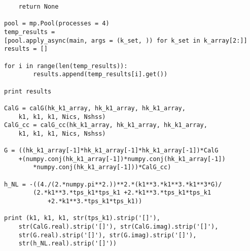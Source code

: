 \documentclass[12pt,a4paper,oneside]{book}
\begin{document}
\begin{appendices}
\begin{small}
\begin{verbatim}
    return None

pool = mp.Pool(processes = 4)
temp_results = 
[pool.apply_async(main, args = (k_set, )) for k_set in k_array[2:]]
results = []

for i in range(len(temp_results)):
        results.append(temp_results[i].get())

print results

CalG = calG(hk_k1_array, hk_k1_array, hk_k1_array, 
	k1, k1, k1, Nics, Nshss)
CalG_cc = calG_cc(hk_k1_array, hk_k1_array, hk_k1_array, 
	k1, k1, k1, Nics, Nshss)

G = ((hk_k1_array[-1]*hk_k1_array[-1]*hk_k1_array[-1])*CalG 
	+(numpy.conj(hk_k1_array[-1])*numpy.conj(hk_k1_array[-1])
		*numpy.conj(hk_k1_array[-1]))*CalG_cc)

h_NL = -((4./(2.*numpy.pi**2.))**2.*(k1**3.*k1**3.*k1**3*G)/
        (2.*k1**3.*tps_k1*tps_k1 +2.*k1**3.*tps_k1*tps_k1 
        	+2.*k1**3.*tps_k1*tps_k1))

print (k1, k1, k1, str(tps_k1).strip('[]'), 
	str(CalG.real).strip('[]'), str(CalG.imag).strip('[]'), 
	str(G.real).strip('[]'), str(G.imag).strip('[]'), 
	str(h_NL.real).strip('[]'))

\end{verbatim}
\end{small}

\end{appendices}

\end{document}
